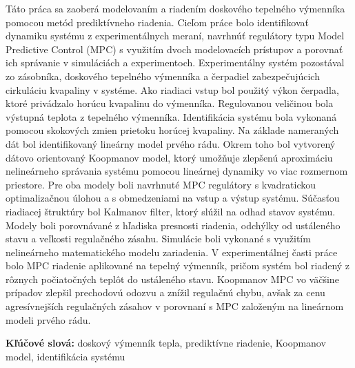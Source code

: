 Táto práca sa zaoberá modelovaním a riadením doskového tepelného výmenníka pomocou metód prediktívneho riadenia. Cieľom práce bolo identifikovať dynamiku systému z experimentálnych meraní, navrhnúť regulátory typu Model Predictive Control (MPC) s využitím dvoch modelovacích prístupov a porovnať ich správanie v simuláciách a experimentoch.
Experimentálny systém pozostával zo zásobníka, doskového tepelného výmenníka a čerpadiel zabezpečujúcich cirkuláciu kvapaliny v systéme. Ako riadiaci vstup bol použitý výkon čerpadla, ktoré privádzalo horúcu kvapalinu do výmenníka. Regulovanou veličinou bola výstupná teplota z tepelného výmenníka.
Identifikácia systému bola vykonaná pomocou skokových zmien prietoku horúcej kvapaliny. Na základe nameraných dát bol identifikovaný lineárny model prvého rádu. Okrem toho bol vytvorený dátovo orientovaný Koopmanov model, ktorý umožňuje zlepšenú aproximáciu nelineárneho správania systému pomocou lineárnej dynamiky vo viac rozmernom priestore.
Pre oba modely boli navrhnuté MPC regulátory s kvadratickou optimalizačnou úlohou a s obmedzeniami na vstup a výstup systému. Súčasťou riadiacej štruktúry bol Kalmanov filter, ktorý slúžil na odhad stavov systému. Modely boli porovnávané z hľadiska presnosti riadenia, odchýlky od ustáleného stavu a veľkosti regulačného zásahu. Simulácie boli vykonané s využitím nelineárneho matematického modelu zariadenia.
V experimentálnej časti práce bolo MPC riadenie aplikované na tepelný výmenník, pričom systém bol riadený z rôznych počiatočných teplôt do ustáleného stavu. Koopmanov MPC vo väčšine prípadov zlepšil prechodovú odozvu a znížil regulačnú chybu, avšak za cenu agresívnejších regulačných zásahov v porovnaní s MPC založeným na lineárnom modeli prvého rádu.

\vspace{0.5cm}
\noindent\textbf{Kľúčové slová:} doskový výmenník tepla, prediktívne riadenie, Koopmanov model, identifikácia systému